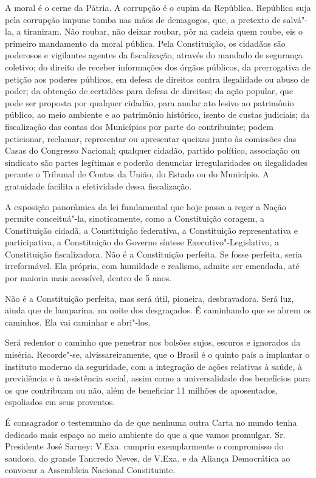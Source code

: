 A moral é o cerne da Pátria. A corrupção é o cupim da República.
República suja pela corrupção impune tomba nas mãos de demagogos, que, a
pretexto de salvá"-la, a tiranizam. Não roubar, não deixar roubar, pôr na
cadeia quem roube, eis o primeiro mandamento da moral pública. Pela
Constituição, os cidadãos são poderosos e vigilantes agentes da
fiscalização, através do mandado de segurança coletivo; do direito de
receber informações dos órgãos públicos, da prerrogativa de petição aos
poderes públicos, em defesa de direitos contra ilegalidade ou abuso de
poder; da obtenção de certidões para defesa de direitos; da ação popular, que pode ser
proposta por qualquer cidadão, para anular ato lesivo ao patrimônio
público, ao meio ambiente e ao patrimônio histórico, isento de custas
judiciais; da fiscalização das contas dos Municípios por parte do
contribuinte; podem peticionar, reclamar, representar ou apresentar
queixas junto às comissões das Casas do Congresso Nacional; qualquer
cidadão, partido político, associação ou sindicato são partes legítimas
e poderão denunciar irregularidades ou ilegalidades perante o Tribunal
de Contas da União, do Estado ou do Município. A gratuidade facilita a
efetividade dessa fiscalização.

A exposição panorâmica da lei fundamental que hoje passa a reger a Nação
permite conceituá"-la, sinoticamente, como a Constituição coragem, a
Constituição cidadã, a Constituição federativa, a Constituição
representativa e participativa, a Constituição do Governo síntese
Executivo"-Legislativo, a Constituição fiscalizadora. Não é a
Constituição perfeita. Se fosse perfeita, seria irreformável. Ela
própria, com humildade e realismo, admite ser emendada, até por maioria
mais acessível, dentro de 5 anos.

Não é a Constituição perfeita, mas será útil, pioneira, desbravadora.
Será luz, ainda que de lamparina, na noite dos desgraçados. É caminhando
que se abrem os caminhos. Ela vai caminhar e abri"-los.

Será redentor o caminho que penetrar nos bolsões sujos, escuros e
ignorados da miséria. Recorde"-se, alvissareiramente, que o Brasil é o
quinto país a implantar o instituto moderno da seguridade, com a
integração de ações relativas à saúde, à previdência e à assistência
social, assim como a universalidade dos benefícios para os que
contribuam ou não, além de beneficiar 11 milhões de aposentados,
espoliados em seus proventos.

É consagrador o testemunho da  de que nenhuma outra Carta no mundo
tenha dedicado mais espaço ao meio ambiente do que a que vamos
promulgar. Sr. Presidente José Sarney: V.Exa. cumpriu exemplarmente o
compromisso do saudoso, do grande Tancredo Neves, de V.Exa. e da Aliança
Democrática ao convocar a Assembleia Nacional Constituinte.

